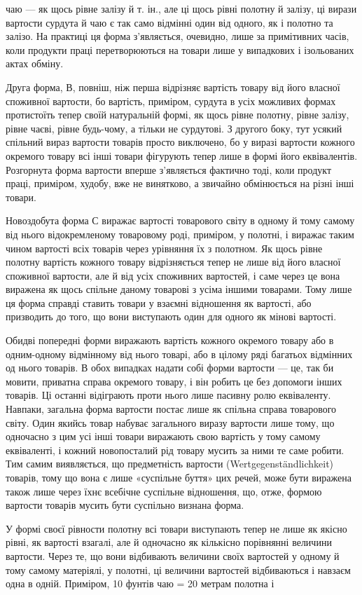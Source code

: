 \parcont{}  %
чаю — як щось рівне залізу й т. ін., але ці щось рівні полотну
й залізу, ці вирази вартости сурдута й чаю є так само відмінні
один від одного, як і полотно та залізо. На практиці ця форма
з’являється, очевидно, лише за примітивних часів, коли продукти
праці перетворюються на товари лише у випадкових і ізольованих
актах обміну.

Друга форма, В, повніш, ніж перша відрізняє вартість товару від
його власної споживної вартости, бо вартість, приміром, сурдута
в усіх можливих формах протистоїть тепер своїй натуральній
формі, як щось рівне полотну, рівне залізу, рівне чаєві, рівне
будь-чому, а тільки не сурдутові. З другого боку, тут усякий
спільний вираз вартости товарів просто виключено, бо у виразі
вартости кожного окремого товару всі інші товари фігурують
тепер лише в формі його еквівалентів. Розгорнута форма вартости
вперше з’являється фактично тоді, коли продукт праці, приміром,
худобу, вже не винятково, а звичайно обмінюється на різні інші
товари.

Новоздобута форма С виражає вартості товарового світу в
одному й тому самому від нього відокремленому товаровому роді,
приміром, у полотні, і виражає таким чином вартості всіх товарів
через урівняння їх з полотном. Як щось рівне полотну вартість
кожного товару відрізняється тепер не лише від його власної
споживної вартости, але й від усіх споживних вартостей, і саме
через це вона виражена як щось спільне даному товарові з усіма
іншими товарами. Тому лише ця форма справді ставить товари у
взаємні відношення як вартості, або призводить до того, що вони
виступають один для одного як мінові вартості.

Обидві попередні форми виражають вартість кожного окремого
товару або в одним-одному відмінному від нього товарі, або в
цілому ряді багатьох відмінних од нього товарів. В обох випадках
надати собі форми вартости — це, так би мовити, приватна справа
окремого товару, і він робить це без допомоги інших товарів. Ці
останні відіграють проти нього лише пасивну ролю еквіваленту.
Навпаки, загальна форма вартости постає лише як спільна справа
товарового світу. Один якийсь товар набуває загального виразу
вартости лише тому, що одночасно з цим усі інші товари виражають
свою вартість у тому самому еквіваленті, і кожний новопосталий
рід товару мусить за ними те саме робити. Тим самим виявляється,
що предметність вартости (Wertgegenständlichkeit)
товарів, тому що вона є лише «суспільне буття» цих речей, може
бути виражена також лише через їхнє всебічне суспільне відношення,
що, отже, формою вартости товарів мусить бути суспільно
визнана форма.

У формі своєї рівности полотну всі товари виступають тепер
не лише як якісно рівні, як вартості взагалі, але й одночасно як
кількісно порівнянні величини вартости. Через те, що вони відбивають
величини своїх вартостей у одному й тому самому матеріялі,
у полотні, ці величини вартостей відбиваються і навзаєм
одна в одній. Приміром, 10 фунтів чаю = 20 метрам полотна і
\parbreak{}  %
